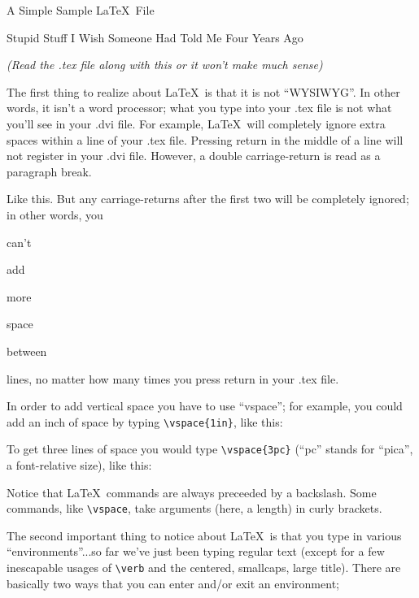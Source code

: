 \documentclass{article}
\begin{document}
\centerline{\sc \large A Simple Sample \LaTeX\ File}
\vspace{.5pc}
\centerline{\sc Stupid Stuff I Wish Someone Had Told Me Four Years Ago}
\centerline{\it (Read the .tex file along with this or it won't
            make much sense)}
\vspace{2pc}

The first thing to realize about \LaTeX\ is that it is not ``WYSIWYG''.
In other words, it isn't a word processor; what you type into your
.tex file is not what you'll see in your .dvi file.  For example,
\LaTeX\ will      completely     ignore               extra
spaces    within                             a line of your .tex file.
Pressing return
in
the
middle
of
a
line
will not register in your .dvi file. However, a double carriage-return
is read as a paragraph break.

Like this.  But any carriage-returns after the first two will be
completely ignored; in other words, you


can't

add






more




space


between




lines, no matter how many times you press return in your .tex file.

In order to add vertical space you have to use ``vspace''; for example,
you could add an inch of space by typing \verb|\vspace{1in}|, like this:
\vspace{1in}

To get three lines of space you would type \verb|\vspace{3pc}|
(``pc'' stands for ``pica'', a font-relative size), like this:
\vspace{3pc}

Notice that \LaTeX\ commands are always preceeded by a backslash.
Some commands, like \verb|\vspace|, take arguments (here, a length) in
curly brackets.

The second important thing to notice about \LaTeX\ is that you type
in various ``environments''...so far we've just been typing regular
text (except for a few inescapable usages of \verb|\verb| and the
centered, smallcaps, large title).  There are basically two ways that
you can enter and/or exit an environment;
\vspace{1pc}
\end{document}
